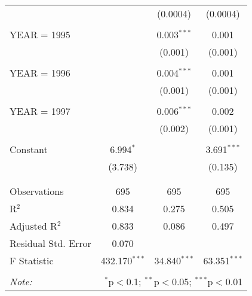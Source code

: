 \documentclass[12pt,a4paper]{article}\usepackage[]{graphicx}\usepackage[]{color}
\begin{document}
\begin{table}[!htbp]
\begin{tabular}{@{\extracolsep{5pt}}lccc}
  &  & (0.0004) & (0.0004) \\ 
  & & & \\ 
 YEAR = 1995 &  & 0.003$^{***}$ & 0.001 \\ 
  &  & (0.001) & (0.001) \\ 
  & & & \\ 
 YEAR = 1996 &  & 0.004$^{***}$ & 0.001 \\ 
  &  & (0.001) & (0.001) \\ 
  & & & \\ 
 YEAR = 1997 &  & 0.006$^{***}$ & 0.002 \\ 
  &  & (0.002) & (0.001) \\ 
  & & & \\ 
 Constant & 6.994$^{*}$ &  & 3.691$^{***}$ \\ 
  & (3.738) &  & (0.135) \\ 
  & & & \\ 
\hline \\[-1.8ex] 
Observations & 695 & 695 & 695 \\ 
R$^{2}$ & 0.834 & 0.275 & 0.505 \\ 
Adjusted R$^{2}$ & 0.833 & 0.086 & 0.497 \\ 
Residual Std. Error & 0.070 &  &  \\ 
F Statistic & 432.170$^{***}$ & 34.840$^{***}$ & 63.351$^{***}$ \\ 
\hline 
\hline \\[-1.8ex] 
\textit{Note:}  & \multicolumn{3}{r}{$^{*}$p$<$0.1; $^{**}$p$<$0.05; $^{***}$p$<$0.01} \\ 
\end{tabular} 
\end{table} 
\end{document}

